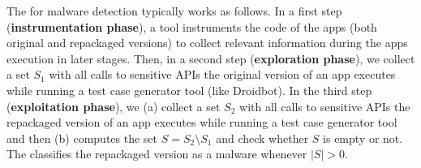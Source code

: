 The \mas for malware detection typically works as follows. In a first step ({\bf instrumentation phase}), 
a tool instruments the code of the apps (both original and repackaged versions) to collect relevant information
during the apps execution in later stages. Then, in a second step ({\bf exploration phase}),
we collect a set $S_1$ with all calls to sensitive APIs the original version of an app executes while running a test case generator tool (like Droidbot).
In the third step ({\bf exploitation phase}), we (a) collect a set $S_2$ with all calls to sensitive APIs the repackaged version of an app
executes while running a test case generator tool and then (b) computes the set $S = S_2 \setminus S_1$ and check whether  $S$ is empty or not.
The \mas classifies the repackaged version as a malware whenever $|S| > 0$.  




